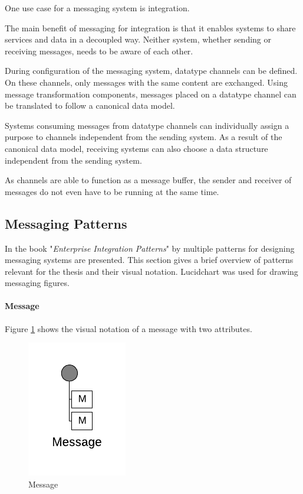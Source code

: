 One use case for a messaging system is integration.

The main benefit of messaging for integration is that it enables systems to share services and data in a decoupled way. Neither system, whether sending or receiving messages, needs to be aware of each other. 

During configuration of the messaging system, datatype channels can be defined. On these channels, only messages with the same content are exchanged. Using message transformation components, messages placed on a datatype channel can be translated to follow a canonical data model.

Systems consuming messages from datatype channels can individually assign a purpose to channels independent from the sending system. As a result of the canonical data model, receiving systems can also choose a data structure independent from the sending system.

As channels are able to function as a message buffer, the sender and receiver of messages do not even have to be running at the same time.

\subsection{Messaging Patterns}

In the book "\textit{Enterprise Integration Patterns}" by \textcite{EIP} multiple patterns for designing messaging systems are presented. This section gives a brief overview of patterns relevant for the thesis and their visual notation. Lucidchart \cite{lucid} was used for drawing messaging figures.

\paragraph{Message}

Figure \ref{messaging:message} shows the visual notation of a message with two attributes. 

\begin{figure}[H]
    \centering
    \includegraphics[scale=0.6]{Diagrams/Messaging/1. Message.pdf}
    \caption{Message}
    \label{messaging:message}
\end{figure}

